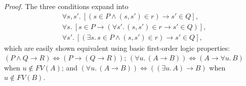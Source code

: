 \noindent\emph{Proof.} The three conditions expand into
\begin{align*}
&\forall s, s'.\ [(s \in P \wedge (s, s') \in r) \rightarrow s' \in Q],\\
&\forall s.\ [s \in P \rightarrow (\forall s'.\, (s, s') \in r \rightarrow s' \in Q)],\\
&\forall s'.\ [(\exists s.\, s \in P \wedge (s, s') \in r) \rightarrow s' \in Q],
\end{align*}
which are easily shown equivalent using basic first-order logic properties: $(P \wedge Q \rightarrow R) \iff (P \rightarrow (Q \rightarrow R))$; $(\forall u.\, (A \rightarrow B)) \iff (A \rightarrow \forall u.\, B)$ when $u \notin FV(A)$; and $(\forall u.\, (A \rightarrow B)) \iff ((\exists u.\, A) \rightarrow B)$ when $u \notin FV(B)$.
% 
